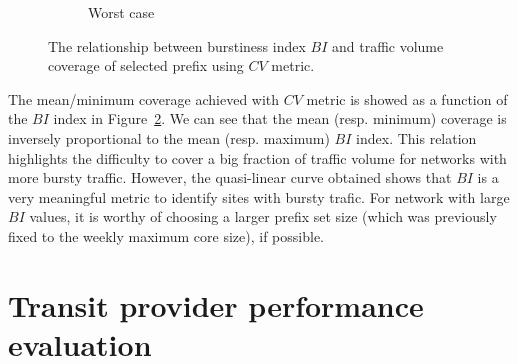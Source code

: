 \begin{figure}[!tb]
\begin{subfigure}[b]{0.53\textwidth}
                \caption{Worst case}
                \label{fig:bi_cvg_worst}
        \end{subfigure}
\caption{The relationship between burstiness index $BI$ and traffic volume coverage of selected prefix using $CV$ metric.}
\label{fig:bi_cvg}
\end{figure}

The mean/minimum coverage achieved with $CV$ metric is showed as a function of the $BI$ index in Figure~\ref{fig:bi_cvg}. 
We can see that the mean (resp. minimum) coverage is inversely proportional to the mean (resp. maximum) $BI$ index. 
This relation highlights the difficulty to cover a big fraction of traffic volume for networks with more bursty traffic. 
However, the quasi-linear curve obtained shows that $BI$ is a very meaningful metric to identify sites with bursty trafic. 
For network with large $BI$ values, it is worthy of choosing a larger prefix set size (which was previously fixed to the weekly maximum core size), if possible. 

\section{Transit provider performance evaluation}
\label{sec:rtt}

